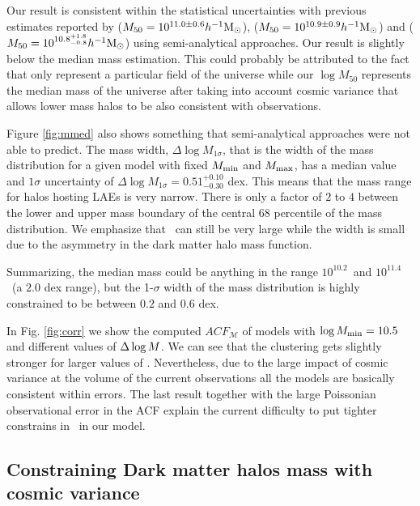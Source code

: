 \documentclass{emulateapj}
\newcommand{\hMsun}{{\ifmmode{h^{-1}{\rm {M_{\odot}}}}\else{$h^{-1}{\rm{M_{\odot}}}$}\fi}}
\newcommand{\mmin}{{\ifmmode{{M_{\rm min}}}\else{${M_{\rm min}}$}\fi}}
\newcommand{\mmax}{{\ifmmode{{M_{\rm max}}}\else{${M_{\rm max}}$}\fi}}
\newcommand{\lmmin}{{\ifmmode{{\log M_{\rm min}}}\else{${\log M_{\rm min}}$}\fi}}
\newcommand{\lmmax}{{\ifmmode{{\log M_{\rm max}}}\else{${\log M_{\rm max}}$}\fi}}
\newcommand{\dlm}{{\ifmmode{{\Delta \log M}}\else{$\Delta \log M$}\fi}}
\begin{document}
Our result is consistent within the statistical uncertainties with
previous estimates reported by
 \citet{Bielby16} ($M_{50} = 10^{11.0\pm0.6} \hMsun$),
 \citet{Gawiser07} ($M_{50}= 10^{10.9\pm0.9} \hMsun$) and
 \citet{Ouchi2010} ($M_{50} = 10^{10.8^{+1.8}_{-0.8}} \hMsun$) 
using semi-analytical approaches.   Our result is slightly below the  \citet{Bielby16}
 median mass estimation. This could probably be attributed to the fact that  \citet{Bielby16}
only represent a particular field of the universe while our $\log M_{50}$  represents the
median mass of the universe after taking into account cosmic variance that allows lower mass 
halos to be also consistent with observations.



Figure \ref{fig:mmed} also shows something 
that semi-analytical approaches were not able to predict.
The mass width, $\Delta \log M_{1\sigma}$, that is the width of the mass
distribution for a given model with fixed $\mmin$ and $\mmax$, has a
median value and $1\sigma$ uncertainty of $\Delta \log M_{1\sigma} =
0.51^{+0.10}_{-0.30}$ dex.
This means that the mass range for halos hosting LAEs is very narrow.
There is only a factor of $2$ to $4$ between the lower and upper mass
boundary of the central 68 percentile of the mass distribution. 
We emphasize that \mmax\ can still be very large while the width is
small due to the asymmetry in the dark matter halo mass function. 


Summarizing, the median mass could be anything in the range
$10^{10.2}$\hMsun\ and $10^{11.4}$\hMsun\ (a $2.0$ dex range), 
but the 1-$\sigma$ width of the mass distribution is highly constrained 
to be between $0.2$ and $0.6$ dex.  


In Fig. \ref{fig:corr} we show the computed
$ACF_{\mathcal{M}}$ of models with $\lmmin=10.5$ and different values
of $\dlm$. We can see that the clustering gets slightly stronger for larger
values of \dlm. Nevertheless, due to the large impact of cosmic
variance at the volume of the current observations all the models  are
basically consistent within errors. The last result together with the
large Poissonian observational error in the ACF explain the current
difficulty to put tighter constrains in \lmmax\ in our model. 


\subsection{Constraining Dark matter halos mass  with cosmic variance}
\end{document}
